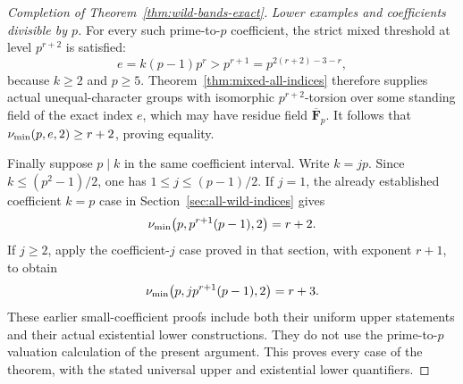 \begin{proof}[Completion of Theorem~\ref{thm:wild-bands-exact}]
\smallskip\noindent
\emph{Lower examples and coefficients divisible by $p$.}
For every such prime-to-$p$ coefficient, the strict mixed threshold
at level $p^{r+2}$ is satisfied:
\[
 e=k(p-1)p^r>p^{r+1}=p^{2(r+2)-3-r},
\]
because $k\ge2$ and $p\ge5$.  Theorem~\ref{thm:mixed-all-indices}
therefore supplies actual unequal-character groups with isomorphic
$p^{r+2}$-torsion over some standing field of the exact index $e$,
which may have residue field $\overline{\mathbf F}_p$.  It follows
that $\nu_{\min}(p,e,2)\ge r+2$, proving equality.

Finally suppose $p\mid k$ in the same coefficient interval.  Write
$k=jp$.  Since $k\le(p^2-1)/2$, one has
$1\le j\le(p-1)/2$.  If $j=1$, the already established coefficient
$k=p$ case in Section~\ref{sec:all-wild-indices} gives
\[
 \nu_{\min}\bigl(p,p^{r+1}(p-1),2\bigr)=r+2.
\]
If $j\ge2$, apply the coefficient-$j$ case proved in that section,
with exponent $r+1$, to obtain
\[
 \nu_{\min}\bigl(p,jp^{r+1}(p-1),2\bigr)=r+3.
\]
These earlier small-coefficient proofs include both their uniform
upper statements and their actual existential lower constructions.
They do not use the prime-to-$p$ valuation calculation of the present
argument.  This proves every case of the theorem, with the stated
universal upper and existential lower quantifiers.
\end{proof}
